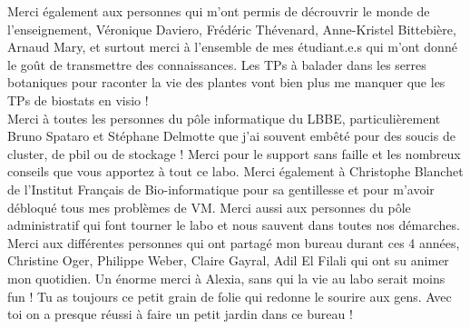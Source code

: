 Merci également aux personnes qui m'ont permis de décrouvrir le monde de l'enseignement, Véronique Daviero, Frédéric Thévenard, Anne-Kristel Bittebière, Arnaud Mary, et surtout merci à l'ensemble de mes étudiant.e.s qui m'ont donné le goût de transmettre des connaissances. Les TPs à balader dans les serres botaniques pour raconter la vie des plantes vont bien plus me manquer que les TPs de biostats en visio ! \\

Merci à toutes les personnes du pôle informatique du LBBE, particulièrement Bruno Spataro et Stéphane Delmotte que j'ai souvent embêté pour des soucis de cluster, de pbil ou de stockage ! Merci pour le support sans faille et les nombreux conseils que vous apportez à tout ce labo. Merci également à Christophe Blanchet de l'Institut Français de Bio-informatique pour sa gentillesse et pour m'avoir débloqué tous mes problèmes de VM. Merci aussi aux personnes du pôle administratif qui font tourner le labo et nous sauvent dans toutes nos démarches. \\

Merci aux différentes personnes qui ont partagé mon bureau durant ces 4 années, Christine Oger, Philippe Weber, Claire Gayral, Adil El Filali qui ont su animer mon quotidien. Un énorme merci à Alexia, sans qui la vie au labo serait moins fun ! Tu as toujours ce petit grain de folie qui redonne le sourire aux gens. Avec toi on a presque réussi à faire un petit jardin dans ce bureau !\\

